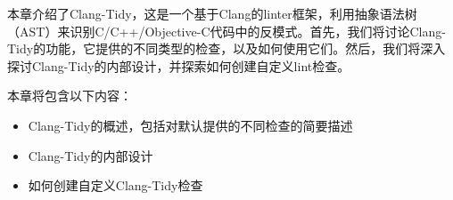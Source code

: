 

本章介绍了Clang-Tidy，这是一个基于Clang的linter框架，利用抽象语法树（AST）来识别C/C++/Objective-C代码中的反模式。首先，我们将讨论Clang-Tidy的功能，它提供的不同类型的检查，以及如何使用它们。然后，我们将深入探讨Clang-Tidy的内部设计，并探索如何创建自定义lint检查。

本章将包含以下内容：

\begin{itemize}
\item
Clang-Tidy的概述，包括对默认提供的不同检查的简要描述

\item
Clang-Tidy的内部设计

\item
如何创建自定义Clang-Tidy检查
\end{itemize}